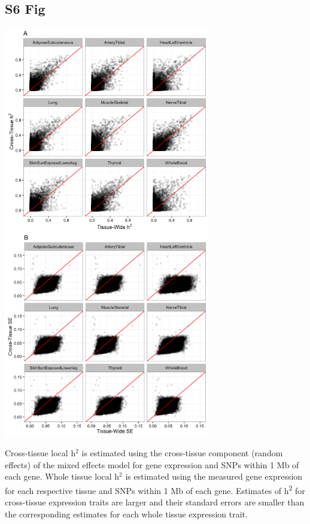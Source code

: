 \documentclass[10pt,letterpaper]{article}
\begin{document}
\begin{singlespace}
\subsection*{S6 Fig}
\includegraphics[width=9cm]{Figures/GenArch_Supp/S3Fig.png}
\label{S6_Fig}

 Cross-tissue local h$^2$ is estimated using the cross-tissue component (random effects) of the mixed effects model for gene expression and SNPs within 1 Mb of each gene. Whole tissue local h$^2$ is estimated using the measured gene expression for each respective tissue and SNPs within 1 Mb of each gene. Estimates of h\textsuperscript{2} for cross-tissue expression traits are larger and their standard errors are smaller than the corresponding estimates for each whole tissue expression trait.


\end{singlespace}
\end{document}

